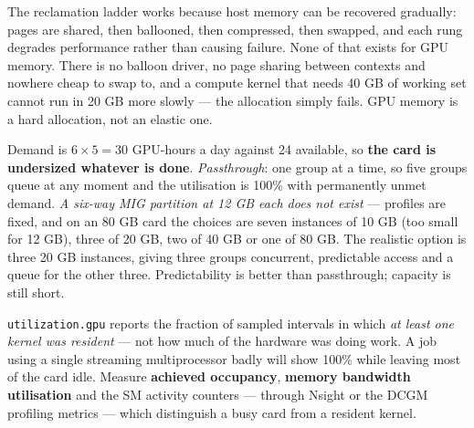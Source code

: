 \begin{ans}
  \item The reclamation ladder works because host memory can be recovered
        gradually: pages are shared, then ballooned, then compressed, then
        swapped, and each rung degrades performance rather than causing failure.
        None of that exists for GPU memory. There is no balloon driver, no
        page sharing between contexts and nowhere cheap to swap to, and a
        compute kernel that needs 40 GB of working set cannot run in 20 GB more
        slowly --- the allocation simply fails. GPU memory is a hard allocation,
        not an elastic one.
  \item Demand is $6 \times 5 = 30$ GPU-hours a day against 24 available, so
        \textbf{the card is undersized whatever is done}. \emph{Passthrough}:
        one group at a time, so five groups queue at any moment and the
        utilisation is 100\% with permanently unmet demand. \emph{A six-way
        MIG partition at 12 GB each does not exist} --- profiles are fixed, and
        on an 80 GB card the choices are seven instances of 10 GB (too small for
        12 GB), three of 20 GB, two of 40 GB or one of 80 GB. The realistic
        option is three 20 GB instances, giving three groups concurrent,
        predictable access and a queue for the other three. Predictability is
        better than passthrough; capacity is still short.
  \item \texttt{utilization.gpu} reports the fraction of sampled intervals in
        which \emph{at least one kernel was resident} --- not how much of the
        hardware was doing work. A job using a single streaming multiprocessor
        badly will show 100\% while leaving most of the card idle. Measure
        \textbf{achieved occupancy}, \textbf{memory bandwidth utilisation} and
        the SM activity counters --- through Nsight or the DCGM profiling
        metrics --- which distinguish a busy card from a resident kernel.
\end{ans}

